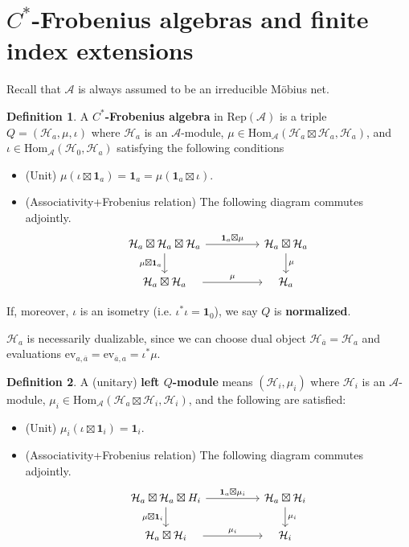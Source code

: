 \documentclass[11pt,b5paper,notitlepage]{article}
\theoremstyle{definition}
\newtheorem{df}{Definition}[section]
\theoremstyle{plain}
\newcommand{\mc}{\mathcal}
\newcommand{\ovl}{\overline}
\newcommand{\id}{\mathbf{1}}
\newcommand{\Hom}{\mathrm{Hom}}
\newcommand{\ev}{\mathrm{ev}}
\newcommand{\RepA}{\mathrm{Rep}(\mathcal A)}
\numberwithin{equation}{section}
\begin{document}
	
\section{$C^*$-Frobenius algebras and finite index extensions}	


Recall that  $\mc A$ is always assumed to be an irreducible M\"obius net.

\begin{df}
	A \textbf{$C^*$-Frobenius algebra} in $\RepA$ is a triple $Q=(\mc H_a,\mu,\iota)$ where $\mc H_a$ is an $\mc A$-module, $\mu\in\Hom_{\mc A}(\mc H_a\boxtimes\mc H_a,\mc H_a)$, and $\iota\in\Hom_{\mc A}(\mc H_0,\mc H_a)$  satisfying the following conditions
	\begin{itemize}
		\item (Unit) $\mu(\iota\boxtimes\id_a)=\id_a=\mu(\id_a\boxtimes\iota)$.
		\item (Associativity+Frobenius relation) The following diagram commutes adjointly.
		\begin{equation}
			\begin{tikzcd}
				\mc H_a\boxtimes\mc H_a\boxtimes \mc H_a\arrow[rr,"\id_a\boxtimes\mu"]\arrow[d,"\mu\boxtimes\id_a"'] && \mc H_a\boxtimes\mc H_a\arrow[d,"\mu"]\\
				\quad\mc H_a\boxtimes\mc H_a\quad\arrow[rr,"\mu"] && \quad\mc H_a\quad
			\end{tikzcd}	
		\end{equation} 
	\end{itemize}
	If, moreover, $\iota$ is an isometry (i.e. $\iota^*\iota=\id_0$), we say $Q$ is \textbf{normalized}.
\end{df}


$\mc H_a$ is necessarily dualizable, since we can choose dual object $\mc H_{\ovl a}=\mc H_a$ and evaluations $\ev_{a,\ovl a}=\ev_{\ovl a,a}=\iota^*\mu$.


\begin{df}
	A (unitary) \textbf{left $Q$-module} means $(\mc H_i,\mu_i)$ where $\mc H_i$ is an $\mc A$-module, $\mu_i\in\Hom_{\mc A}(\mc H_a\boxtimes\mc H_i,\mc H_i)$, and the following are satisfied:	
	\begin{itemize}
		\item (Unit) $\mu_i(\iota\boxtimes\id_i)=\id_i$.
		\item (Associativity+Frobenius relation) The following diagram commutes adjointly.
		\begin{equation}\label{eq3}
			\begin{tikzcd}
				\mc H_a\boxtimes\mc H_a\boxtimes H_i\arrow[rr,"\id_a\boxtimes\mu_i"]\arrow[d,"\mu\boxtimes\id_i"'] && \mc H_a\boxtimes\mc H_i\arrow[d,"\mu_i"]\\
				\quad\mc H_a\boxtimes\mc H_i\quad\arrow[rr,"\mu_i"] && \quad\mc H_i\quad
			\end{tikzcd}	
		\end{equation} 
	\end{itemize}	
\end{df}	
\end{document}
